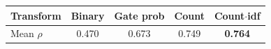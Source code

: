 \setlength{\tabcolsep}{2.25pt}
\begin{tabular}{lcccc}
\toprule
Transform & Binary & Gate prob & Count & Count$\cdot$idf \\
\midrule
Mean $\rho$ & 0.470 & 0.673 & 0.749 & \textbf{0.764} \\
\bottomrule
\end{tabular}
